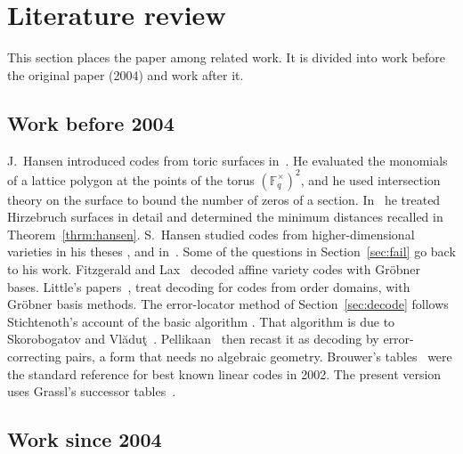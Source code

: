 \documentclass[12pt,letterpaper]{article}
\numberwithin{equation}{section}
\theoremstyle{definition}
\theoremstyle{remark}
\newcommand{\Fqs}{\mathbb{F}_q^{\times}}
\begin{document}
\section{Literature review}\label{sec:lit}

This section places the paper among related work. It is divided into work
before the original paper (2004) and work after it.

\subsection{Work before 2004}

J.~Hansen introduced codes from toric surfaces in~\cite{Ha00}. He evaluated
the monomials of a lattice polygon at the points of the torus
$(\Fqs)^2$, and he used intersection theory on the surface to bound the number
of zeros of a section. In~\cite{Ha02} he treated Hirzebruch surfaces in detail
and determined the minimum distances recalled in Theorem~\ref{thrm:hansen}.
S.~Hansen studied codes from higher-dimensional varieties in his theses
\cite{SH96}, \cite{SH99} and in~\cite{SH01}. Some of the questions in
Section~\ref{sec:fail} go back to his work. Fitzgerald and Lax~\cite{FL98} decoded affine
variety codes with Gr\"obner bases. Little's papers~\cite{Li03a}, \cite{Li03b}
treat decoding for codes from order domains, with Gr\"obner basis methods. The
error-locator method of Section~\ref{sec:decode} follows Stichtenoth's account
of the basic algorithm \cite[pp.~217--218]{St93}. That algorithm is due to
Skorobogatov and Vl\u{a}du\c{t}~\cite{SV90}. Pellikaan~\cite{Pe92} then
recast it as decoding by error-correcting pairs, a form that needs no
algebraic geometry. Brouwer's tables~\cite{Br98} were the standard reference
for best known linear codes in 2002. The present version uses Grassl's
successor tables~\cite{Gr26}.

\subsection{Work since 2004}
\end{document}
